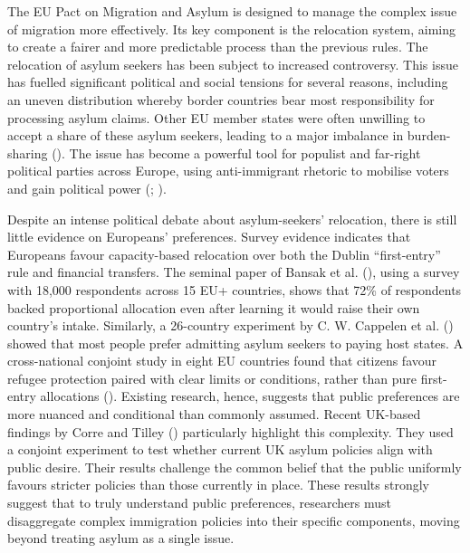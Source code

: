 \documentclass[
  12pt,
  a4paper,
]{article}
\begin{document}
The EU Pact on Migration and Asylum is designed to manage the complex issue of migration more effectively. Its key component is the relocation system, aiming to create a fairer and more predictable process than the previous rules. The relocation of asylum seekers has been subject to increased controversy. This issue has fuelled significant political and social tensions for several reasons, including an uneven distribution whereby border countries bear most responsibility for processing asylum claims. Other EU member states were often unwilling to accept a share of these asylum seekers, leading to a major imbalance in burden-sharing (). The issue has become a powerful tool for populist and far-right political parties across Europe, using anti-immigrant rhetoric to mobilise voters and gain political power (; ).

Despite an intense political debate about asylum-seekers' relocation, there is still little evidence on Europeans' preferences. Survey evidence indicates that Europeans favour capacity-based relocation over both the Dublin ``first-entry'' rule and financial transfers. The seminal paper of Bansak et al. (), using a survey with 18,000 respondents across 15 EU+ countries, shows that 72\% of respondents backed proportional allocation even after learning it would raise their own country's intake. Similarly, a 26-country experiment by C. W. Cappelen et al. () showed that most people prefer admitting asylum seekers to paying host states. A cross-national conjoint study in eight EU countries found that citizens favour refugee protection paired with clear limits or conditions, rather than pure first-entry allocations (). Existing research, hence, suggests that public preferences are more nuanced and conditional than commonly assumed. Recent UK-based findings by Corre and Tilley () particularly highlight this complexity. They used a conjoint experiment to test whether current UK asylum policies align with public desire. Their results challenge the common belief that the public uniformly favours stricter policies than those currently in place. These results strongly suggest that to truly understand public preferences, researchers must disaggregate complex immigration policies into their specific components, moving beyond treating asylum as a single issue.
\end{document}
